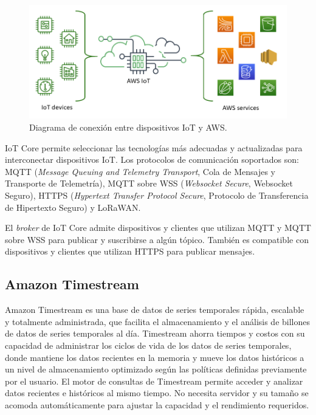 \begin{figure}[h]
	\centering
	\includegraphics[scale=0.5]{./Figures/aws_iot.png}
	\caption{Diagrama de conexión entre dispositivos IoT y AWS.}
	\label{fig:aws_iot}
\end{figure}

IoT Core permite seleccionar las tecnologías más adecuadas y actualizadas para interconectar dispositivos IoT. Los protocolos de comunicación soportados son: MQTT (\textit{Message Queuing and Telemetry Transport}, Cola de Mensajes y Transporte de Telemetría), MQTT sobre WSS (\textit{Websocket Secure}, Websocket Seguro), HTTPS (\textit{Hypertext Transfer Protocol Secure}, Protocolo de Transferencia de Hipertexto Seguro) y LoRaWAN.

El \textit{broker} de IoT Core admite dispositivos y clientes que utilizan MQTT y MQTT sobre WSS para publicar y suscribirse a algún tópico. También es compatible con dispositivos y clientes que utilizan HTTPS para publicar mensajes.

\subsection{Amazon Timestream}
Amazon Timestream es una base de datos de series temporales rápida, escalable y totalmente administrada, que facilita el almacenamiento y el análisis de billones de datos de series temporales al día. Timestream ahorra tiempos y costos con su capacidad de administrar los ciclos de vida de los datos de series temporales, donde mantiene los datos recientes en la memoria y mueve los datos históricos a un nivel de almacenamiento optimizado según las políticas definidas previamente por el usuario. El motor de consultas de Timestream permite acceder y analizar datos recientes e históricos al mismo tiempo. No necesita servidor y su tamaño se acomoda automáticamente para ajustar la capacidad y el rendimiento requeridos.

